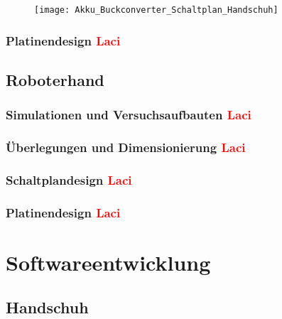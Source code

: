 \documentclass[11pt]{article}
\begin{document}
\begin{figure}[H]
	\begin{center}
		\scalebox{0.5}
		{\texttt{[image: Akku\_Buckconverter\_Schaltplan\_Handschuh]}}
	\end{center}
\end{figure}

\subsubsection{Platinendesign \textcolor{red}{Laci}}

\subsection{Roboterhand}
\subsubsection{Simulationen und Versuchsaufbauten \textcolor{red}{Laci}}
\subsubsection{Überlegungen und Dimensionierung \textcolor{red}{Laci}}
\subsubsection{Schaltplandesign \textcolor{red}{Laci}}
\subsubsection{Platinendesign \textcolor{red}{Laci}}


\section{Softwareentwicklung}

\subsection{Handschuh}
\end{document}
